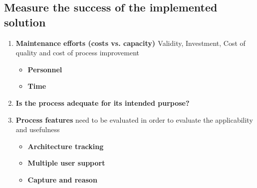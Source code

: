 \subsection{Measure the success of the implemented solution}
\begin{enumerate}
\item \textbf{Maintenance efforts (costs vs. capacity) \cite{Shahin2014}} 
Validity, Investment, Cost of quality and cost of process improvement \cite{Gorschek2006}
\begin{itemize}
\item \textbf{Personnel}
\item \textbf{Time}
\end{itemize}
\item \textbf{Is the process adequate for its intended purpose?}
\item \textbf{Process features}
 need to be evaluated in order to evaluate the applicability and usefulness \cite{Fuggeffa1988}
\begin{itemize}
\item \textbf{Architecture tracking}
\item \textbf{Multiple user support}
\item \textbf{Capture and reason}
\end{itemize}
\end{enumerate}


